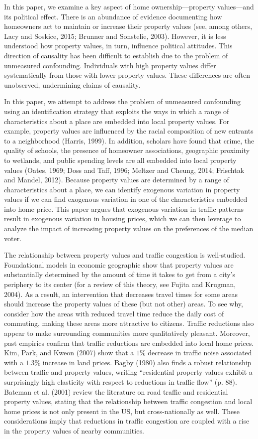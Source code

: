 \documentclass[11.0pt]{article}
\theoremstyle{definition}
\begin{document}
In this paper, we examine a key aspect of home ownership---property values---and its political effect. There is an abundance of evidence documenting how homeowners act to maintain or increase their property values (see, among others, Lacy and Soskice, 2015; Brunner and Sonstelie, 2003). However, it is less understood how property values, in turn, influence political attitudes. This direction of causality has been difficult to establish due to the problem of unmeasured confounding. Individuals with high property values differ systematically from those with lower property values. These differences are often unobserved, undermining claims of causality. 

In this paper, we attempt to address the problem of unmeasured confounding using an identification strategy that exploits the ways in which a range of characteristics about a place are embedded into local property values. For example, property values are influenced by the racial composition of new entrants to a neighborhood (Harris, 1999). In addition, scholars have found that crime, the quality of schools, the presence of homeowner associations, geographic proximity to wetlands, and public spending levels are all embedded into local property values (Oates, 1969; Doss and Taff, 1996; Meltzer and Cheung, 2014; Frischtak and Mandel, 2012). Because property values are determined by a range of characteristics about a place, we can identify exogenous variation in property values if we can find exogenous variation in one of the characteristics embedded into home price. This paper argues that exogenous variation in traffic patterns result in exogenous variation in housing prices, which we can then leverage to analyze the impact of increasing property values on the preferences of the median voter. 

The relationship between property values and traffic congestion is well-studied. Foundational models in economic geographic show that property values are substantially determined by the amount of time it takes to get from a city's periphery to its center (for a review of this theory, see Fujita and Krugman, 2004). As a result, an intervention that decreases travel times for some areas should increase the property values of these (but not other) areas. To see why, consider how the areas with reduced travel time reduce the daily cost of commuting, making these areas more attractive to citizens. Traffic reductions also appear to make surrounding communities more qualitatively pleasant. Moreover, past empirics confirm that traffic reductions are embedded into local home prices. Kim, Park, and Kweon (2007) show that a $1\%$ decrease in traffic noise associated with a $1.3\%$ increase in land prices. Bagby (1980) also finds a robust relationship between traffic and property values, writing ``residential property values exhibit a surprisingly high elasticity with respect to reductions in traffic flow'' (p. 88). Bateman et al. (2001) review the literature on road traffic and residential property values, stating that the relationship between traffic congestion and local home prices is not only present in the US, but cross-nationally as well. These considerations imply that reductions in traffic congestion are coupled with a rise in the property values of nearby communities. 
\end{document}
